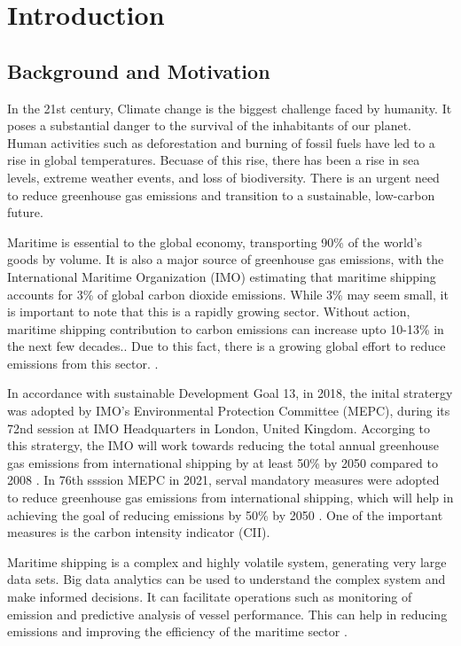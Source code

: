 \chapter{Introduction}
\setcounter{page}{1}

\section{Background and Motivation}

In the 21st century, Climate change is the biggest challenge faced by humanity. It poses a substantial danger to the survival of the inhabitants of our planet.
Human activities such as deforestation and burning of fossil fuels have led to a rise in global temperatures.
Becuase of this rise, there has been a rise in sea levels, extreme weather events, and loss of biodiversity.
There is an urgent need to reduce greenhouse gas emissions and transition to a sustainable, low-carbon future.

Maritime is essential to the global economy, transporting 90\% of the world's goods by volume.
It is also a major source of greenhouse gas emissions, with the International Maritime Organization (IMO)
estimating that maritime shipping accounts for 3\% of global carbon dioxide emissions.
While 3\% may seem small, it is important to note that this is a rapidly growing sector.
Without action, maritime shipping contribution to carbon emissions can increase upto 10-13\% in the next few decades..
Due to this fact, there is a growing global effort to reduce emissions from this sector. \autocite{king_anthony_2022}.

In accordance with sustainable Development Goal 13, in 2018, the inital stratergy was adopted by IMO's Environmental Protection Committee (MEPC),
during its 72nd session at IMO Headquarters in London, United Kingdom. Accorging to this stratergy,
the IMO will work towards reducing the total annual greenhouse gas emissions from international shipping by at least 50\% by 2050 compared to 2008 \autocite{imo-2018}.
In 76th ssssion MEPC in 2021, serval mandatory measures were adopted to reduce greenhouse gas emissions from international shipping,
which will help in achieving the goal of reducing emissions by 50\% by 2050 \autocite{imo-2021}. One of the important measures is the carbon intensity indicator (CII).

Maritime shipping is a complex and highly volatile system, generating very large data sets.
Big data analytics can be used to understand the complex system and make informed decisions.
It can facilitate operations such as monitoring of emission and predictive analysis of vessel performance.
This can help in reducing emissions and improving the efficiency of the maritime sector \autocite{ZAMAN2017537}.





